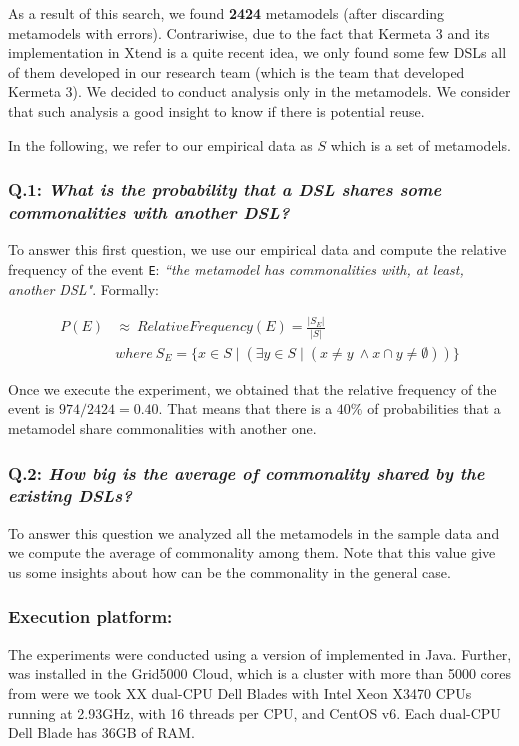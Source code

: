 As a result of this search, we found \textbf{2424} metamodels (after discarding metamodels with errors). Contrariwise, due to the fact that Kermeta 3 and its implementation in Xtend is a quite recent idea, we only found some few DSLs all of them developed in our research team (which is the team that developed Kermeta 3). We decided to conduct analysis only in the metamodels. We consider that such analysis a good insight to know if there is potential reuse. 

In the following, we refer to our empirical data as $S$ which is a set of metamodels.

\vspace{-3mm}
\subsubsection{Q.1: \textit{What is the probability that a DSL shares some commonalities with another DSL?}} To answer this first question, we use our empirical data and compute the relative frequency of the event \texttt{E}: \textit{``the metamodel has commonalities with, at least, another DSL"}. Formally:

\begin{equation}
\begin{split}
P(E) & \approx ~ Relative Frequency (E) = \frac{|S_{E}|}{|S|}\\
& where ~ S_{E} = \{x \in S \mid (\exists y \in S \mid (x \neq y ~ \wedge x \cap y \neq \emptyset )) \}
\end{split}
\end{equation}

Once we execute the experiment, we obtained that the relative frequency of the event is $974/2424 = 0.40$. That means that there is a $40\%$ of probabilities that a metamodel share commonalities with another one. 

\vspace{-3mm}
\subsubsection{Q.2: \textit{How big is the average of commonality shared by the existing DSLs?}} To answer this question we analyzed all the metamodels in the sample data and we compute the average of commonality among them. Note that this value give us some insights about how can be the commonality in the general case. 

\vspace{-3mm}
\subsubsection{Execution platform:} The experiments were conducted using a version of \toolname implemented in Java. Further, \toolname was installed in the Grid5000 Cloud, which is a cluster with more than 5000 cores from were we took XX dual-CPU Dell Blades with Intel Xeon X3470 CPUs running at 2.93GHz, with 16 threads 
per CPU, and CentOS v6. Each dual-CPU Dell Blade has 36GB of RAM. 


